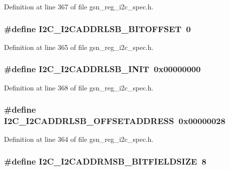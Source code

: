 Definition at line 367 of file gsn\_\-reg\_\-i2c\_\-spec.h.

\hypertarget{a00558_af690d9325b3db66d4719431ea4a0a6e0}{
\subsubsection[{I2C\_\-I2CADDRLSB\_\-BITOFFSET}]{\setlength{\rightskip}{0pt plus 5cm}\#define I2C\_\-I2CADDRLSB\_\-BITOFFSET~0}}
\label{a00558_af690d9325b3db66d4719431ea4a0a6e0}


Definition at line 365 of file gsn\_\-reg\_\-i2c\_\-spec.h.

\hypertarget{a00558_a0102dd5fc9475784743c5d387cd23674}{
\subsubsection[{I2C\_\-I2CADDRLSB\_\-INIT}]{\setlength{\rightskip}{0pt plus 5cm}\#define I2C\_\-I2CADDRLSB\_\-INIT~0x00000000}}
\label{a00558_a0102dd5fc9475784743c5d387cd23674}


Definition at line 368 of file gsn\_\-reg\_\-i2c\_\-spec.h.

\hypertarget{a00558_a309191450332e4103bf64d7a4f1ad1dc}{
\subsubsection[{I2C\_\-I2CADDRLSB\_\-OFFSETADDRESS}]{\setlength{\rightskip}{0pt plus 5cm}\#define I2C\_\-I2CADDRLSB\_\-OFFSETADDRESS~0x00000028}}
\label{a00558_a309191450332e4103bf64d7a4f1ad1dc}


Definition at line 364 of file gsn\_\-reg\_\-i2c\_\-spec.h.

\hypertarget{a00558_ac4b5182d5d9d1d9feb6fc4badf94cdf5}{
\subsubsection[{I2C\_\-I2CADDRMSB\_\-BITFIELDSIZE}]{\setlength{\rightskip}{0pt plus 5cm}\#define I2C\_\-I2CADDRMSB\_\-BITFIELDSIZE~8}}
\label{a00558_ac4b5182d5d9d1d9feb6fc4badf94cdf5}


